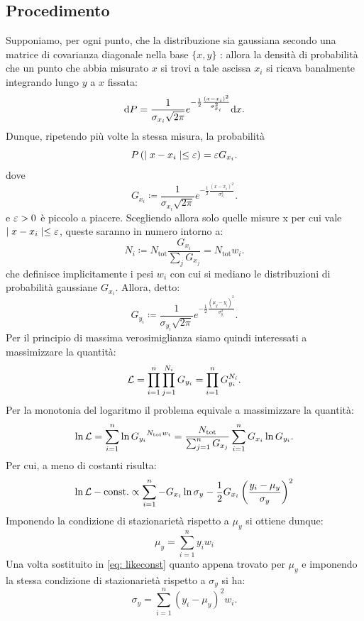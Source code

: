 \documentclass{article}[a4paper, oneside, 11pt]
\begin{document}
\subsection{Procedimento}
Supponiamo, per ogni punto, che la distribuzione sia gaussiana secondo una
matrice di covarianza diagonale nella base $\{x, y\}$ : allora la densità di
probabilità che un punto che abbia misurato $x$ si trovi a tale ascissa $x_i$
si ricava banalmente integrando lungo $y$ a $x$ fissata:
\[
	\mathrm{d} P = \frac{1}{\sigma_{x_i} \sqrt{2\pi}}
	e^{-\frac{1}{2}{\frac{(x - x_i)^2}{\sigma_{x_i}^2}}} \mathrm{d} x
.\] 
Dunque, ripetendo più volte la stessa misura, la probabilità
\[
	P\left( \mid x - x_i \mid  \leq \varepsilon  \right) = \varepsilon G_{x_i} 
.\]
dove \[
	G_{x_i} \coloneqq \frac{1}{\sigma_{x_i} \sqrt{2\pi}}
	e^{-\frac{1}{2}{\frac{(x - x_i)^2}{\sigma_{x_i}^2}}}
.\] 
e $\varepsilon > 0$ è piccolo a piacere. Scegliendo allora solo quelle misure x per
cui vale $\mid x - x_i \mid \leq \varepsilon$, queste saranno in numero intorno a:
\[
	N_i \coloneqq N_{\text{tot}} \frac{G_{x_i}}{\sum_j G_{x_j}} =
		N_{\text{tot}} w_i
.\] 
che definisce implicitamente i pesi $w_i$ con cui si mediano le distribuzioni
di probabilità gaussiane $G_{x_i}$.
Allora, detto:
\[
	G_{y_i} \coloneqq \frac{1}{\sigma_{y_i} \sqrt{2\pi}}
	e^{-\frac{1}{2}{\frac{(\mu_y - y_i)^2}{\sigma_{y_i}^2}}}
.\] 
Per il principio di massima verosimiglianza siamo quindi interessati a
massimizzare la quantità:
\[
	\mathcal L = \prod_{i=1}^{n} \prod_{j=1}^{N_i} G_{y_i} = 
	\prod_{i=1}^{n} G_{y_i}^{N_i}
.\] 
Per la monotonia del logaritmo il problema equivale a massimizzare la quantità:
\[
	\ln{\mathcal L} = \sum_{i=1}^{n}\ln{G_{y_i}}^{N_{\text{tot}}w_i} = 
	\frac{N_{\text{tot}}} {\sum_{j=1}^{n} G_{x_j}} 
	\sum_{i=1}^{n} G_{x_i} \ln{G_{y_i}}
.\] 
Per cui, a meno di costanti risulta:
\begin{equation}\label{eq: likeconst}
	\ln{\mathcal L} - \text{const.} \propto \sum_{i=1}^{n} -G_{x_i} \ln{\sigma_y}
	- \frac{1}{2} G_{x_i} \left( \frac{y_i - \mu_y}{\sigma_y} \right)^2
\end{equation}
Imponendo la condizione di stazionarietà rispetto a $\mu_y$ si ottiene dunque:
\begin{equation}\label{eq: muy}
	\mu_y = \sum_{i=1}^{n} y_i w_i 
\end{equation} 
Una volta sostituito in \eqref{eq: likeconst} quanto appena trovato per $\mu_y$
e imponendo la stessa condizione di stazionarietà rispetto a $\sigma_y$ si ha:
\begin{equation}\label{eq: sigmay}
	\sigma_y = \sum_{i=1}^{n} (y_i - \mu_y)^2 w_i .
\end{equation}
\end{document}
